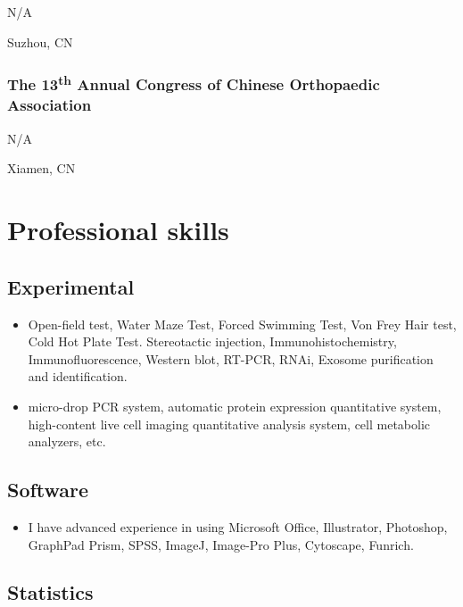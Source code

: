 \documentclass[
]{article}
\providecommand{\tightlist}{%
  \setlength{\itemsep}{0pt}\setlength{\parskip}{0pt}}
\begin{document}
N/A

Suzhou, CN

\hypertarget{the-13th-annual-congress-of-chinese-orthopaedic-association}{%
\subsubsection{\texorpdfstring{The 13\textsuperscript{th} Annual
Congress of Chinese Orthopaedic
Association}{The 13th Annual Congress of Chinese Orthopaedic Association}}\label{the-13th-annual-congress-of-chinese-orthopaedic-association}}

N/A

Xiamen, CN

\hypertarget{professional-skills}{%
\section{Professional skills}\label{professional-skills}}

\hypertarget{experimental}{%
\subsection{Experimental}\label{experimental}}

\begin{itemize}
\tightlist
\item
  Open-field test, Water Maze Test, Forced Swimming Test, Von Frey Hair
  test, Cold Hot Plate Test. Stereotactic injection,
  Immunohistochemistry, Immunofluorescence, Western blot, RT-PCR, RNAi,
  Exosome purification and identification.
\item
  micro-drop PCR system, automatic protein expression quantitative
  system, high-content live cell imaging quantitative analysis system,
  cell metabolic analyzers, etc.
\end{itemize}

\hypertarget{software}{%
\subsection{Software}\label{software}}

\begin{itemize}
\tightlist
\item
  I have advanced experience in using Microsoft Office, Illustrator,
  Photoshop, GraphPad Prism, SPSS, ImageJ, Image-Pro Plus, Cytoscape,
  Funrich.
\end{itemize}

\hypertarget{statistics}{%
\subsection{Statistics}\label{statistics}}
\end{document}
